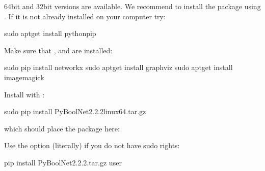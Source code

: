 \documentclass[letterpaper,10pt,english]{sphinxmanual}
\begin{document}
64bit and 32bit versions are available. We recommend to install the package using . If it is not already installed on your computer try:

\begin{sphinxVerbatim}[commandchars=\\\{\}]
\PYGZdl{} sudo apt\PYGZhy{}get install python\PYGZhy{}pip
\end{sphinxVerbatim}

Make sure that {\hyperref[\detokenize{Installation:installation-networkx}]{}}, {\hyperref[\detokenize{Installation:installation-graphviz}]{}} and {\hyperref[\detokenize{Installation:installation-imagemagick}]{}} are installed:

\begin{sphinxVerbatim}[commandchars=\\\{\}]
\PYGZdl{} sudo pip install networkx
\PYGZdl{} sudo apt\PYGZhy{}get install graphviz
\PYGZdl{} sudo apt\PYGZhy{}get install imagemagick
\end{sphinxVerbatim}

Install  with :

\begin{sphinxVerbatim}[commandchars=\\\{\}]
\PYGZdl{} sudo pip install PyBoolNet\PYGZhy{}2.2.2\PYGZus{}linux64.tar.gz
\end{sphinxVerbatim}

which should place the package here:

\begin{sphinxVerbatim}[commandchars=\\\{\}]
\end{sphinxVerbatim}

Use the option  (literally) if you do not have sudo rights:

\begin{sphinxVerbatim}[commandchars=\\\{\}]
\PYGZdl{} pip install PyBoolNet\PYGZhy{}2.2.2.tar.gz \PYGZhy{}\PYGZhy{}user
\end{sphinxVerbatim}
\end{document}

